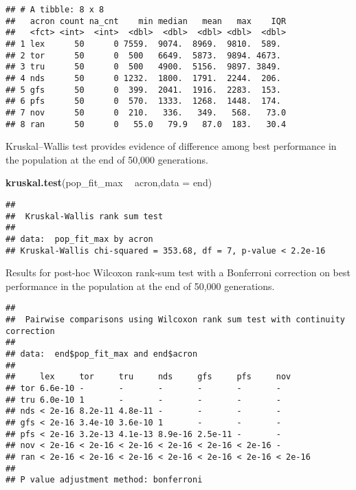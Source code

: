 \documentclass[]{book}
\newenvironment{Shaded}{\begin{snugshade}}{\end{snugshade}}
\newcommand{\DataTypeTok}[1]{\textcolor[rgb]{0.13,0.29,0.53}{#1}}
\newcommand{\KeywordTok}[1]{\textcolor[rgb]{0.13,0.29,0.53}{\textbf{#1}}}
\newcommand{\NormalTok}[1]{#1}
\newcommand{\OperatorTok}[1]{\textcolor[rgb]{0.81,0.36,0.00}{\textbf{#1}}}
\newcommand{\OtherTok}[1]{\textcolor[rgb]{0.56,0.35,0.01}{#1}}
\newcommand{\StringTok}[1]{\textcolor[rgb]{0.31,0.60,0.02}{#1}}
\begin{document}
\begin{verbatim}
## # A tibble: 8 x 8
##   acron count na_cnt    min median   mean   max    IQR
##   <fct> <int>  <int>  <dbl>  <dbl>  <dbl> <dbl>  <dbl>
## 1 lex      50      0 7559.  9074.  8969.  9810.  589. 
## 2 tor      50      0  500   6649.  5873.  9894. 4673. 
## 3 tru      50      0  500   4900.  5156.  9897. 3849. 
## 4 nds      50      0 1232.  1800.  1791.  2244.  206. 
## 5 gfs      50      0  399.  2041.  1916.  2283.  153. 
## 6 pfs      50      0  570.  1333.  1268.  1448.  174. 
## 7 nov      50      0  210.   336.   349.   568.   73.0
## 8 ran      50      0   55.0   79.9   87.0  183.   30.4
\end{verbatim}

Kruskal--Wallis test provides evidence of difference among best performance in the population at the end of 50,000 generations.

\begin{Shaded}
\begin{Highlighting}[]
\KeywordTok{kruskal.test}\NormalTok{(pop_fit_max }\OperatorTok{~}\StringTok{ }\NormalTok{acron,}\DataTypeTok{data =}\NormalTok{ end)}
\end{Highlighting}
\end{Shaded}

\begin{verbatim}
## 
##  Kruskal-Wallis rank sum test
## 
## data:  pop_fit_max by acron
## Kruskal-Wallis chi-squared = 353.68, df = 7, p-value < 2.2e-16
\end{verbatim}

Results for post-hoc Wilcoxon rank-sum test with a Bonferroni correction on best performance in the population at the end of 50,000 generations.

\begin{Shaded}
\end{Shaded}

\begin{verbatim}
## 
##  Pairwise comparisons using Wilcoxon rank sum test with continuity correction 
## 
## data:  end$pop_fit_max and end$acron 
## 
##     lex     tor     tru     nds     gfs     pfs     nov    
## tor 6.6e-10 -       -       -       -       -       -      
## tru 6.0e-10 1       -       -       -       -       -      
## nds < 2e-16 8.2e-11 4.8e-11 -       -       -       -      
## gfs < 2e-16 3.4e-10 3.6e-10 1       -       -       -      
## pfs < 2e-16 3.2e-13 4.1e-13 8.9e-16 2.5e-11 -       -      
## nov < 2e-16 < 2e-16 < 2e-16 < 2e-16 < 2e-16 < 2e-16 -      
## ran < 2e-16 < 2e-16 < 2e-16 < 2e-16 < 2e-16 < 2e-16 < 2e-16
## 
## P value adjustment method: bonferroni
\end{verbatim}
\end{document}

